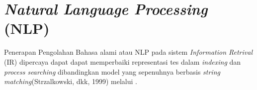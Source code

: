 \section{\emph{Natural Language Processing} (NLP)} %

Penerapan Pengolahan Bahasa alami atau NLP pada sistem \emph{Information Retrival} (IR) dipercaya dapat dapat memperbaiki representasi tes dalam \emph{indexing} dan \emph{process searching} dibandingkan model yang sepenuhnya berbasis \emph{string matching}(Strzalkowski, dkk, 1999) melalui \citep{haryawan}.


